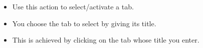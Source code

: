 \begin{itemize}
\item Use this action to select/activate a tab.
\item You choose the tab to select by giving its title.
\item This is achieved by clicking on the tab whose title you enter.
\end{itemize}
 